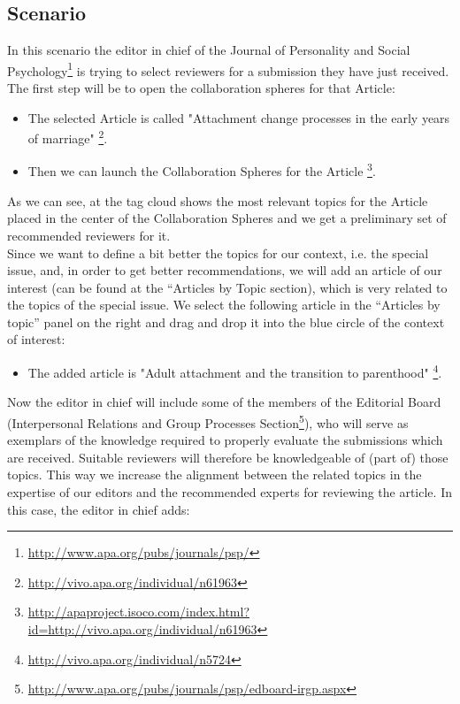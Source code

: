 \subsection{Scenario}
In this scenario the editor in chief of the Journal of Personality and Social
Psychology\footnote{\url{http://www.apa.org/pubs/journals/psp/}} is trying to
select reviewers for a submission they have just received. The first step will
be to open the collaboration spheres for that Article: 
\begin{itemize}
  \item The selected Article is called "Attachment change processes in the early
years of marriage" \footnote{\url{http://vivo.apa.org/individual/n61963}}.
  \item Then we can launch the Collaboration Spheres for the Article
\footnote{\url{http://apaproject.isoco.com/index.html?id=http://vivo.apa.org/individual/n61963}}.
\end{itemize}
As we can see, at the tag cloud shows the most relevant topics for the Article
placed in the center of the Collaboration Spheres and we get a preliminary set
of recommended reviewers for it.\\
Since we want to define a bit better the topics for our context, i.e. the
special issue, and, in order to get better recommendations, we will add an
article of our interest (can be found at the “Articles by Topic section), which
is very related to the topics of the special issue. We select the following
article in the “Articles by topic” panel on the right and drag and drop it into
the blue circle of the context of interest:
\begin{itemize}
  \item The added article is "Adult attachment and the transition to parenthood"
\footnote{\url{http://vivo.apa.org/individual/n5724}}.
\end{itemize}
Now the editor in chief will include some of the members of the Editorial Board
(Interpersonal Relations and Group Processes
Section\footnote{\url{http://www.apa.org/pubs/journals/psp/edboard-irgp.aspx}}),
who will serve as exemplars of the knowledge required to properly evaluate the
submissions which are received. Suitable reviewers will therefore be
knowledgeable of (part of) those topics. This way we increase the alignment
between the related topics in the expertise of our editors and the recommended
experts for reviewing the article. In this case, the editor in chief adds:
